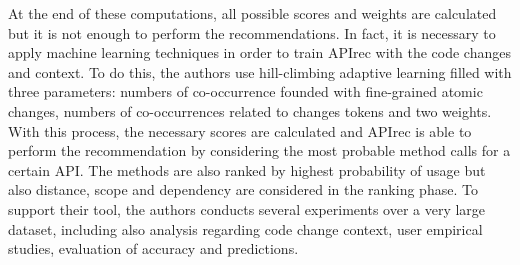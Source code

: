 At the end of these computations, all possible scores and weights are calculated but it is not enough to perform the recommendations. In fact, it is necessary to apply machine learning techniques in order to train APIrec with the code changes and context. To do this, the authors use hill-climbing adaptive learning filled with three parameters: numbers of co-occurrence founded with fine-grained atomic changes, numbers of co-occurrences related to changes tokens and two weights. With this process, the necessary scores are calculated and APIrec is able to perform the recommendation by considering the most probable method calls for a certain API. The methods are also ranked by highest probability of usage but also distance, scope and dependency are considered in the ranking phase. To support their tool, the authors conducts several experiments over a very large dataset, including also analysis regarding code change context, user empirical studies, evaluation of accuracy and predictions.




